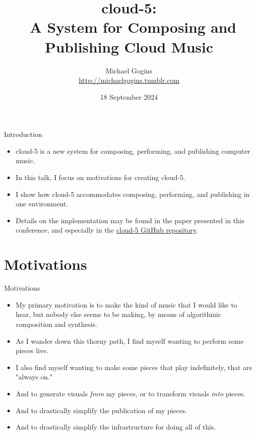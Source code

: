 \documentclass{beamer}
\title[cloud-5] %
{cloud-5: \\\
A System for Composing and Publishing Cloud Music}
\author[Gogins] %
{Michael Gogins \\ \url{http://michaelgogins.tumblr.com} }
\institute[Irreducible Productions] %
{
  Irreducible Productions\\
  New York
}
\date[18 September 2024] %
{18 September 2024}
\begin{document}

\begin{frame}
  \titlepage
\end{frame}

\begin{frame}{Introduction}
\begin{itemize}
\item cloud-5 is a new system for composing, performing, and publishing computer music. 
\item In this talk, I focus on motivations for creating cloud-5.
\item I show how cloud-5 accommodates composing, performing, and publishing in one environment. 
\item Details on the implementation may be found in the paper presented in this conference, and especially in the \href{https://github.com/gogins/cloud-5}{cloud-5 GitHub repository}.
\end{itemize}
\end{frame}


\section{Motivations}

\begin{frame}{Motivations}
\begin{itemize}
\item My primary motivation is to make the kind of music that I would like to hear, but nobody else seems to be making, by means of algorithmic composition and synthesis.
\item As I wander down this thorny path, I find myself wanting to perform some pieces live.
\item I also find myself wanting to make some pieces that play indefinitely, that are "always on."
\item And to generate visuals \emph{from} my pieces, or to transform visuals \emph{into} pieces.
\item And to drastically simplify the publication of my pieces.
\item And to drastically simplify the infrastructure for doing all of this.
\end{itemize}
\end{frame}
\end{document}
